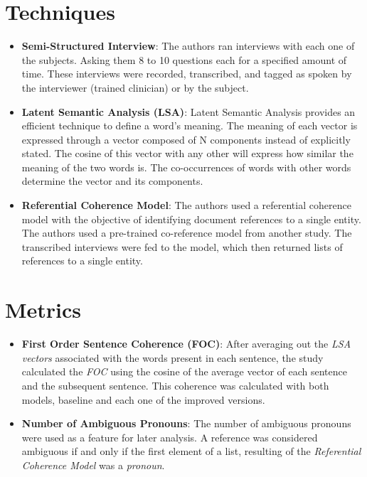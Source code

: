 \documentclass{Paper_Summary}
\begin{document}
\section{Techniques}
    \begin{itemize}
        \item \textbf{Semi-Structured Interview}: The authors ran interviews with each one of the subjects. Asking them 8 to 10 questions each for a specified amount of time. These interviews were recorded, transcribed, and tagged as spoken by the interviewer (trained clinician) or by the subject.
        \item \textbf{Latent Semantic Analysis (LSA)}: Latent Semantic Analysis provides an efficient technique to define a word's meaning. The meaning of each vector is expressed through a vector composed of N components instead of explicitly stated. The cosine of this vector with any other will express how similar the meaning of the two words is. The co-occurrences of words with other words determine the vector and its components.
        \item \textbf{Referential Coherence Model}: The authors used a referential coherence model with the objective of identifying document references to a single entity. The authors used a pre-trained co-reference model from another study. The transcribed interviews were fed to the model, which then returned lists of references to a single entity.
    \end{itemize}

\section{Metrics}
    \begin{itemize}
        \item \textbf{First Order Sentence Coherence (FOC)}: After averaging out the \emph{LSA vectors} associated with the words present in each sentence, the study calculated the \emph{FOC} using the cosine of the average vector of each sentence and the subsequent sentence. This coherence was calculated with both models, baseline and each one of the improved versions.
        \item \textbf{Number of Ambiguous Pronouns}: The number of ambiguous pronouns were used as a feature for later analysis. A reference was considered ambiguous if and only if the first element of a list, resulting of the \emph{Referential Coherence Model} was a \emph{pronoun}.
    \end{itemize}
\end{document}
